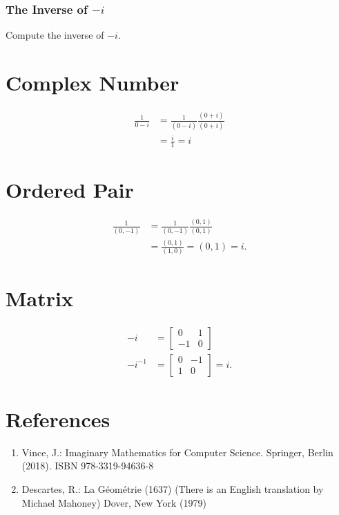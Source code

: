 \subsubsection{The Inverse of $-i$}
Compute the inverse of $-i$.

\section{Complex Number}
$$
\begin{aligned}
\frac{1}{0-i} & =\frac{1}{(0-i)} \frac{(0+i)}{(0+i)} \\
& =\frac{i}{1}=i
\end{aligned}
$$

\section{Ordered Pair}
$$
\begin{aligned}
\frac{1}{(0,-1)} & =\frac{1}{(0,-1)} \frac{(0,1)}{(0,1)} \\
& =\frac{(0,1)}{(1,0)}=(0,1)=i .
\end{aligned}
$$

\section{Matrix}
$$
\begin{aligned}
-i & =\left[\begin{array}{cc}
0 & 1 \\
-1 & 0
\end{array}\right] \\
-i^{-1} & =\left[\begin{array}{cc}
0 & -1 \\
1 & 0
\end{array}\right]=i .
\end{aligned}
$$

\section{References}
\begin{enumerate}
  \item Vince, J.: Imaginary Mathematics for Computer Science. Springer, Berlin (2018). ISBN 978-3319-94636-8

  \item Descartes, R.: La Géométrie (1637) (There is an English translation by Michael Mahoney) Dover, New York (1979)

\end{enumerate}

